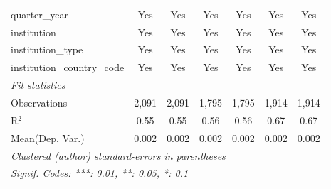 \begin{tabular}{lcccccc}
   quarter\_year                      & Yes     & Yes      & Yes     & Yes      & Yes     & Yes\\  
   institution                        & Yes     & Yes      & Yes     & Yes      & Yes     & Yes\\  
   institution\_type                  & Yes     & Yes      & Yes     & Yes      & Yes     & Yes\\  
   institution\_country\_code         & Yes     & Yes      & Yes     & Yes      & Yes     & Yes\\  
   \midrule
   \emph{Fit statistics}\\
   Observations                       & 2,091   & 2,091    & 1,795   & 1,795    & 1,914   & 1,914\\  
   R$^2$                              & 0.55    & 0.55     & 0.56    & 0.56     & 0.67    & 0.67\\  
Mean(Dep. Var.) & 0.002 & 0.002 & 0.002 & 0.002 & 0.002 & 0.002 \\
   \midrule \midrule
   \multicolumn{7}{l}{\emph{Clustered (author) standard-errors in parentheses}}\\
   \multicolumn{7}{l}{\emph{Signif. Codes: ***: 0.01, **: 0.05, *: 0.1}}\\
\end{tabular}
\par\endgroup
